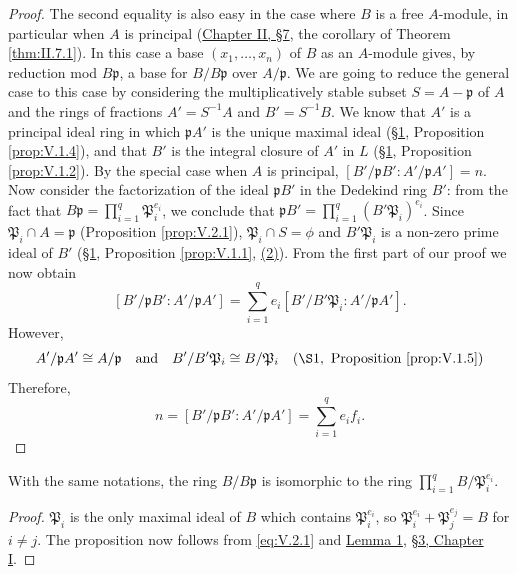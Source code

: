 \begin{proof}
The second equality is also easy in the case where $B$ is a free
$A$-module, in particular when $A$ is principal (\hyperref[sec:2.7]{Chapter II, §7}, the
corollary of Theorem \ref{thm:II.7.1}). In this case a base
$(x_{1},\ldots,x_{n})$ of $B$ as an $A$-module gives, by reduction mod
$B\mathfrak{p}$, a base for $B/B\mathfrak{p}$ over $A/\mathfrak{p}$. We are
going to reduce the general case to this case by considering the
multiplicatively stable subset $S=A-\mathfrak{p}$ of $A$ and the rings of
fractions $A'=S^{-1}A$ and $B'=S^{-1}B$. We know that $A'$ is a principal
ideal ring in which $\mathfrak{p}A'$ is the unique maximal ideal (\hyperref[sec:5.1]{§1},
Proposition \ref{prop:V.1.4}), and that $B'$ is the integral closure of $A'$
in $L$ (\hyperref[sec:5.1]{§1}, Proposition \ref{prop:V.1.2}). By the special case when $A$ is
principal, $[B'/\mathfrak{p}B':A'/\mathfrak{p}A']=n$. Now consider the
factorization of the ideal $\mathfrak{p}B'$ in the Dedekind ring $B'$: from
the fact that
$B\mathfrak{p}=\prod_{i=1}^{q}\mathfrak{P}_{i}^{e_{i}}$, we conclude that
$\mathfrak{p}B'=\prod_{i=1}^{q}(B'\mathfrak{P}_{i})^{e_{i}}$. Since
$\mathfrak{P}_{i}\cap A=\mathfrak{p}$ (Proposition \ref{prop:V.2.1}),
$\mathfrak{P}_{i}\cap S=\phi$ and $B'\mathfrak{P}_{i}$ is a non-zero prime
ideal of $B'$ (\hyperref[sec:5.1]{§1}, Proposition \ref{prop:V.1.1}, \hyperref[prop:V.1.1.2]{(2)}). From the first part
of our proof we now obtain
\[
[B'/\mathfrak{p}B':A'/\mathfrak{p}A']
=\sum_{i=1}^{q}e_{i}[B'/B'\mathfrak{P}_{i}:A'/\mathfrak{p}A'].
\]
However,
\[
A'/\mathfrak{p}A'\cong A/\mathfrak{p}\quad\text{and}\quad
B'/B'\mathfrak{P}_{i}\cong B/\mathfrak{P}_{i}\quad
(\S1,\ \text{Proposition \ref{prop:V.1.5}})
\]
Therefore,
\[
n=[B'/\mathfrak{p}B':A'/\mathfrak{p}A']=\sum_{i=1}^{q}e_{i}f_{i}.
\]
\end{proof}

\begin{proposition}
\label{prop:V.2.2}
With the same notations, the ring $B/B\mathfrak{p}$ is isomorphic to the
ring $\prod_{i=1}^{q}B/\mathfrak{P}_{i}^{e_{i}}$.
\end{proposition}

\begin{proof}
$\mathfrak{P}_{i}$ is the only maximal ideal of $B$ which contains
$\mathfrak{P}_{i}^{e_{i}}$, so
$\mathfrak{P}_{i}^{e_{i}}+\mathfrak{P}_{j}^{e_{j}}=B$ for $i\neq j$. The
proposition now follows from \eqref{eq:V.2.1} and \hyperref[lem:I.3.1]{Lemma 1}, \hyperref[sec:1.3]{§3, Chapter I}.
\end{proof}

